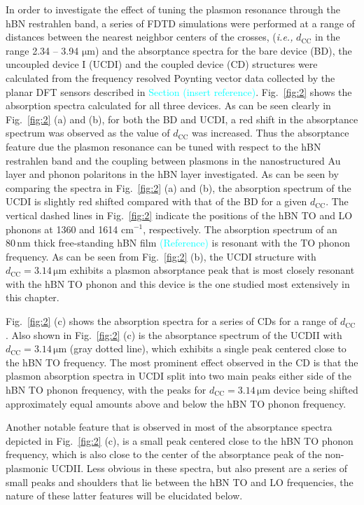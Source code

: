 \documentclass[preprint,
amsmath,amssymb,
aip,
jap,
floatfix,]{revtex4-2}
\begin{document}
			In order to investigate the effect of tuning the plasmon resonance through the hBN restrahlen band, a series of FDTD simulations were performed at a range of distances between the nearest neighbor centers of the crosses, (\textit{i.e.,} $d_\mathrm{CC}$ in the range 2.34 -- 3.94 $\si{\um}$) and the absorptance spectra for the bare device (BD), the uncoupled device I (UCDI) and the coupled device (CD) structures were calculated from the frequency resolved Poynting vector data collected by the planar DFT sensors described in \textcolor{cyan}{Section (insert reference)}.  Fig.~\ref{fig:2} shows the absorption spectra calculated for all three devices. As can be seen clearly in Fig.~\ref{fig:2} (a) and (b), for both the BD and UCDI, a red shift in the absorptance spectrum was observed as the value of $d_\mathrm{CC}$ was increased. Thus the absorptance feature due the plasmon resonance can be tuned with respect to the hBN restrahlen band and the coupling between plasmons in the nanostructured Au layer and phonon polaritons in the hBN layer investigated. As can be seen by comparing the spectra in Fig.~\ref{fig:2} (a) and (b), the absorption spectrum of the UCDI is slightly red shifted compared with that of the BD for a given $d_\mathrm{CC}$. The vertical dashed lines in  Fig.~\ref{fig:2} indicate the positions of the hBN TO and LO phonons at 1360 and 1614 $\mathrm{cm}^{-1}$, respectively. The absorption spectrum of an $80\,\si{\nm}$ thick free-standing hBN film \textcolor{cyan}{(Reference)} is resonant with the TO phonon frequency. As can be seen from Fig.~\ref{fig:2} (b), the UCDI structure with $d_\mathrm{CC} = 3.14\,\si{\um}$ exhibits a plasmon absorptance peak that is most closely resonant with the hBN TO phonon and this device is the one studied most extensively in this chapter.

			Fig.~\ref{fig:2} (c) shows the absorption spectra for a series of CDs for a range of  $d_\mathrm{CC}$. Also shown in Fig.~\ref{fig:2} (c) is the absorptance spectrum of the UCDII with $d_\mathrm{CC} = 3.14\,\si{\um}$ (gray dotted line), which exhibits a single peak centered close to the hBN TO frequency. The most prominent effect observed in the CD is that the plasmon absorption spectra in UCDI split into two main peaks either side of the hBN TO phonon frequency, with the peaks for $d_\mathrm{CC} = 3.14\,\si{\um}$ device being shifted approximately equal amounts above and below the hBN TO phonon frequency.

			Another notable feature that is observed in most of the absorptance spectra depicted in Fig.~\ref{fig:2} (c), is a small peak centered close to the hBN TO phonon frequency, which is also close to  the center of the absorptance peak of the non-plasmonic UCDII. Less obvious in these spectra, but also present are a series of small peaks and shoulders that lie between the hBN TO and LO frequencies, the nature of these latter features will be elucidated below.  
\end{document}

